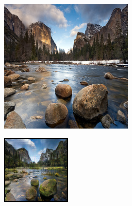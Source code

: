 \documentclass{article}
\begin{document}
\begin{figure}[H]
    \begin{subfigure}{.165\textwidth}
        \centering
        \includegraphics[width=0.75\linewidth]{Input_2.jpg}
        \caption{}
    \end{subfigure}%
    \begin{subfigure}{.165\textwidth}
        \centering
        \includegraphics[width=0.75\linewidth]{output_2_cycle_gan.png}
        \caption{}
    \end{subfigure}%
    \begin{subfigure}{.165\textwidth}
        \centering

\end{subfigure}
\end{figure}
\end{document}
